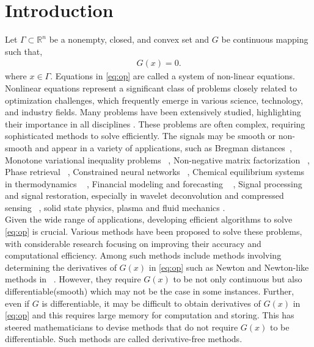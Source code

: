 \documentclass{article}
\theoremstyle{remark}
\begin{document}
\section{Introduction}
Let $\Gamma \subset \mathbb{R}^n$ be a nonempty, closed, and convex set and $G$ be continuous mapping such that,  
\begin{align}
    G(x) = 0. \label{eq:op}
\end{align}
where $x \in \Gamma$. Equations in \eqref{eq:op} are called a system of non-linear equations.\\
Nonlinear equations represent a significant class of problems closely related to optimization challenges, which frequently emerge in various science, technology, and industry fields. Many problems have been extensively studied, highlighting their importance in all disciplines \cite{ahookhosh2013two}. These problems are often complex, requiring sophisticated methods to solve efficiently.
The signals may be smooth or non-smooth and appear in a variety of applications, such as Bregman distances~\cite{iusem1997newton}, Monotone variational inequality problems ~\cite{he2002new, malitsky2014extragradient, zhao2001monotonicity}, Non-negative matrix factorization ~\cite{berry2007algorithms}, Phase retrieval~ \cite{candes2015phase}, Constrained neural networks~ \cite{chorowski2014learning}, Chemical equilibrium systems in thermodynamics ~ \cite{meintjes1987methodology, zeleznik1968calculation}, Financial modeling and forecasting ~ \cite{dai2020efficient}, Signal processing and signal restoration, especially in wavelet deconvolution and compressed sensing ~\cite{abubakar2020note, figueiredo2007gradient},   solid state physics, plasma and fluid mechanics \cite{chen2019gramian, gao2019mathematical}.\\ 
Given the wide range of applications, developing efficient algorithms to solve \eqref{eq:op} is crucial. Various methods have been proposed to solve these problems, with considerable research focusing on improving their accuracy and computational efficiency. Among such methods include methods involving determining the derivatives of $G(x)$ in \eqref{eq:op} such as Newton and Newton-like methods in ~\cite{iusem1997newton, nocedal1999numerical}. However, they require $G(x)$ to be not only continuous but also differentiable(smooth) which may not be the case in some instances. Further, even if $G$ is differentiable, it may be difficult to obtain derivatives of $G(x)$ in \eqref{eq:op} and this requires large memory for computation and storing. This has steered mathematicians to devise methods that do not require $G(x)$ to be differentiable. Such methods are called derivative-free methods. \\
\end{document}
